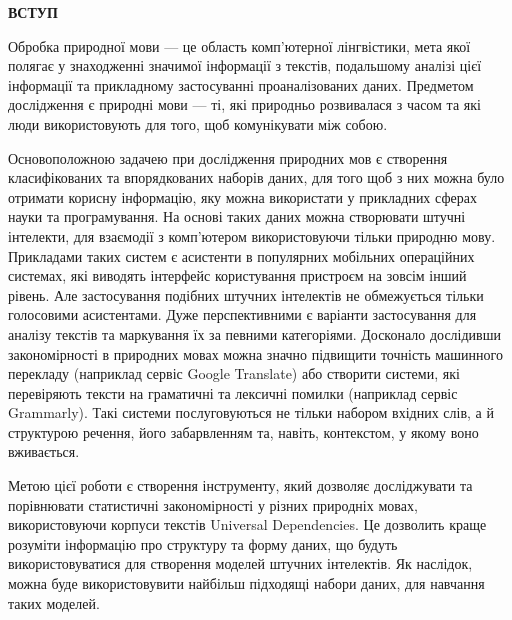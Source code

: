 \thispagestyle{empty}

\begin{center}
\textbf{\Large ВСТУП}
\end{center}

Обробка природної мови --- це область комп’ютерної лінгвістики, мета якої
полягає у знаходженні значимої інформації з текстів, подальшому аналізі цієї
інформації та прикладному застосуванні проаналізованих даних. Предметом
дослідження є природні мови --- ті, які природньо розвивалася з часом та які люди
використовують для того, щоб комунікувати між собою.

Основоположною задачею при дослідження природних мов є створення класифікованих
та впорядкованих наборів даних, для того щоб з них можна було отримати
корисну інформацію, яку можна використати у прикладних сферах науки та програмування.
На основі таких даних можна створювати штучні інтелекти, для взаємодії з комп'ютером
використовуючи тільки природню мову. Прикладами таких систем є асистенти в популярних
мобільних операційних системах, які виводять інтерфейс користування пристроєм
на зовсім інший рівень. Але застосування подібних штучних інтелектів
не обмежується тільки голосовими асистентами. Дуже перспективними є варіанти застосування
для аналізу текстів та маркування їх за певними категоріями. Досконало дослідивши
закономірності в природних мовах можна значно підвищити точність машинного перекладу
(наприклад сервіс Google Translate) або створити системи, які перевіряють
тексти на граматичні та лексичні помилки (наприклад сервіс Grammarly). Такі системи
послуговуються не тільки набором вхідних слів, а й структурою речення,
його забарвленням та, навіть, контекстом, у якому воно вживається.

Метою цієї роботи є створення інструменту, який дозволяє досліджувати та порівнювати
статистичні закономірності у різних природніх мовах,
використовуючи корпуси текстів Universal Dependencies. Це дозволить краще розуміти
інформацію про структуру та форму даних, що будуть використовуватися для
створення моделей штучних інтелектів. Як наслідок, можна буде використовувити
найбільш підходящі набори даних, для навчання таких моделей.